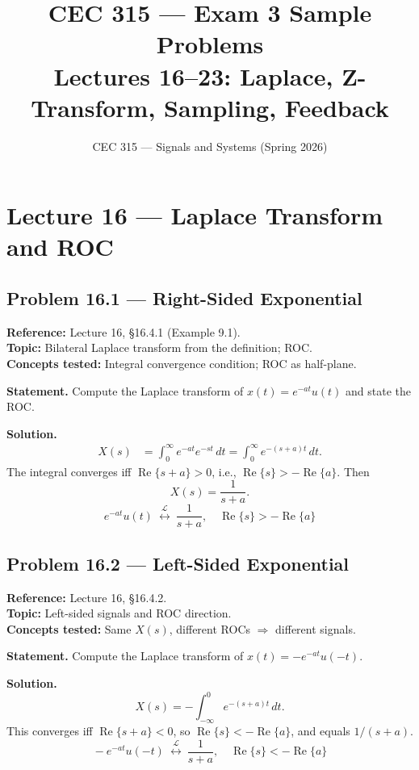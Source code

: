 \documentclass[11pt]{article}
\title{CEC 315 --- Exam 3 Sample Problems\\\large Lectures 16--23: Laplace, Z-Transform, Sampling, Feedback}
\author{CEC 315 --- Signals and Systems (Spring 2026)}
\date{}
\newcommand{\Lap}{\overset{\mathcal{L}}{\longleftrightarrow}}
\begin{document}
\maketitle
\tableofcontents
\newpage

\section{Lecture 16 --- Laplace Transform and ROC}

\subsection{Problem 16.1 --- Right-Sided Exponential}
\textbf{Reference:} Lecture 16, \S 16.4.1 (Example 9.1).\\
\textbf{Topic:} Bilateral Laplace transform from the definition; ROC.\\
\textbf{Concepts tested:} Integral convergence condition; ROC as half-plane.

\textbf{Statement.} Compute the Laplace transform of $x(t) = e^{-at}u(t)$ and state the ROC.

\textbf{Solution.}
\begin{align*}
X(s) &= \int_0^{\infty} e^{-at} e^{-st}\,dt = \int_0^{\infty} e^{-(s+a)t}\,dt.
\end{align*}
The integral converges iff $\operatorname{Re}\{s+a\}>0$, i.e., $\operatorname{Re}\{s\}>-\operatorname{Re}\{a\}$. Then
\[
X(s) = \frac{1}{s+a}.
\]
\[
\boxed{\,e^{-at}u(t)\ \Lap\ \frac{1}{s+a},\quad \operatorname{Re}\{s\}>-\operatorname{Re}\{a\}\,}
\]

\subsection{Problem 16.2 --- Left-Sided Exponential}
\textbf{Reference:} Lecture 16, \S 16.4.2.\\
\textbf{Topic:} Left-sided signals and ROC direction.\\
\textbf{Concepts tested:} Same $X(s)$, different ROCs $\Rightarrow$ different signals.

\textbf{Statement.} Compute the Laplace transform of $x(t)=-e^{-at}u(-t)$.

\textbf{Solution.}
\[
X(s) = -\int_{-\infty}^{0} e^{-(s+a)t}\,dt.
\]
This converges iff $\operatorname{Re}\{s+a\}<0$, so $\operatorname{Re}\{s\}<-\operatorname{Re}\{a\}$, and equals $1/(s+a)$.
\[
\boxed{\,-e^{-at}u(-t)\ \Lap\ \frac{1}{s+a},\quad \operatorname{Re}\{s\}<-\operatorname{Re}\{a\}\,}
\]
\end{document}
